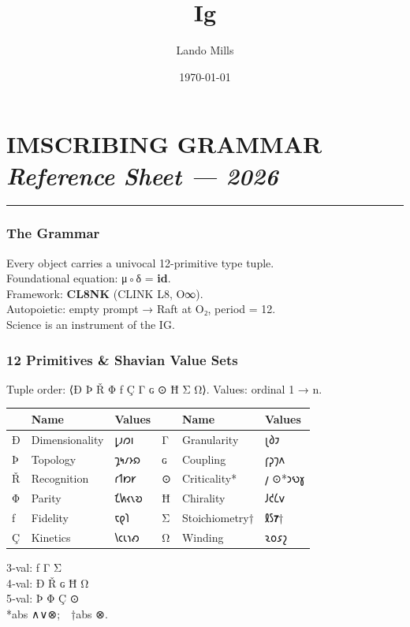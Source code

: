 \documentclass[12pt,a4paper]{article}
\title{Ig}
\date{\today}
\author{Lando Mills}
\begin{document}
\maketitle
\hypertarget{imscribing-grammar-reference-sheet-2026}{%
\section{\texorpdfstring{IMSCRIBING GRAMMAR \emph{Reference Sheet ---
2026}}{IMSCRIBING GRAMMAR Reference Sheet --- 2026}}\label{imscribing-grammar-reference-sheet-2026}}

\begin{center}\rule{0.5\linewidth}{0.5pt}\end{center}

\hypertarget{the-grammar}{%
\subsubsection{The Grammar}\label{the-grammar}}

Every object carries a univocal 12-primitive type tuple.\\
Foundational equation: μ◦δ = \textbf{id}.\\
Framework: \textbf{CL8NK} (CLINK L8, O∞).\\
Autopoietic: empty prompt → Raft at O₂, period = 12.\\
Science is an instrument of the IG.

\hypertarget{primitives-shavian-value-sets}{%
\subsubsection{12 Primitives \& Shavian Value
Sets}\label{primitives-shavian-value-sets}}

Tuple order: ⟨Ð Þ Ř Φ ƒ Ç Γ ɢ ⊙ Ħ Σ Ω⟩. Values: ordinal 1 → n.

\begin{longtable}[]{@{}llllll@{}}
\toprule
& Name & Values & & Name & Values\tabularnewline
\midrule
\endhead
Ð & Dimensionality & 𐑛𐑨𐑼𐑦 & Γ & Granularity & 𐑚𐑔𐑲\tabularnewline
Þ & Topology & 𐑡𐑰𐑥𐑶𐑸 & ɢ & Coupling & 𐑝𐑜𐑠𐑵\tabularnewline
Ř & Recognition & 𐑩𐑑𐑽𐑾 & ⊙ & Criticality* & 𐑢 ⊙*𐑮𐑻𐑣\tabularnewline
Φ & Parity & 𐑗𐑿𐑬𐑯𐑹 & Ħ & Chirality & 𐑓𐑒𐑖𐑫\tabularnewline
ƒ & Fidelity & 𐑱𐑞𐑐 & Σ & Stoichiometry† & 𐑙𐑕\textbf{𐑳}†\tabularnewline
Ç & Kinetics & 𐑘𐑤𐑧𐑪𐑺 & Ω & Winding & 𐑷𐑴𐑭𐑟\tabularnewline
\bottomrule
\end{longtable}

3‑val: ƒ Γ Σ\\
4‑val: Ð Ř ɢ Ħ Ω\\
5‑val: Þ Φ Ç ⊙\\
*abs ∧∨⊗; †abs ⊗.
\end{document}
